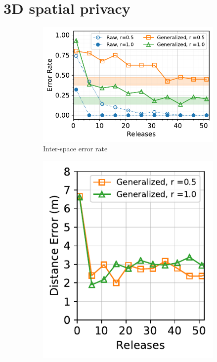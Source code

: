 \section{3D spatial privacy}

\begin{figure}[t]
	\centering
	\vspace{-2mm}
	\begin{subfigure}{0.61\columnwidth}
		\includegraphics[width=\columnwidth]{figures/cdng-successive-interspace.pdf}
		\vspace{-5mm}
		\caption{\footnotesize Inter-space error rate\newline }
		\label{fig:successive-interspace}
	\end{subfigure}
	\begin{subfigure}{0.37\columnwidth}
		\includegraphics[width=\columnwidth]{figures/cdng-successive-intraspace.pdf}

\end{subfigure}
\end{figure}
